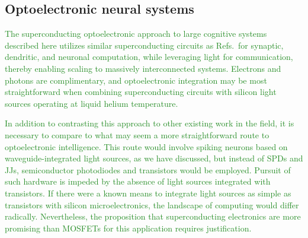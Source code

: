 \documentclass[twocolumn]{article}
\newcommand{\onlinecite}[1]{\hspace{-1 ex} \nocite{#1}\citenum{#1}}
\begin{document}
\subsection{Optoelectronic neural systems}
\textcolor{ForestGreen}{The superconducting optoelectronic approach to large cognitive systems described here utilizes similar superconducting circuits as Refs.\,\onlinecite{hias2007,sele2017,scdo2018} for synaptic, dendritic, and neuronal computation, while leveraging light for communication, thereby enabling scaling to massively interconnected systems. Electrons and photons are complimentary, and optoelectronic integration may be most straightforward when combining superconducting circuits with silicon light sources operating at liquid helium temperature.}

\textcolor{ForestGreen}{In addition to contrasting this approach to other existing work in the field, it is necessary to compare to what may seem a more straightforward route to optoelectronic intelligence. This route would involve spiking neurons based on waveguide-integrated light sources, as we have discussed, but instead of SPDs and JJs, semiconductor photodiodes and transistors would be employed. Pursuit of such hardware is impeded by the absence of light sources integrated with transistors. If there were a known means to integrate light sources as simple as transistors with silicon microelectronics, the landscape of computing would differ radically. Nevertheless, the proposition that superconducting electronics are more promising than MOSFETs for this application requires justification.}
\end{document}
